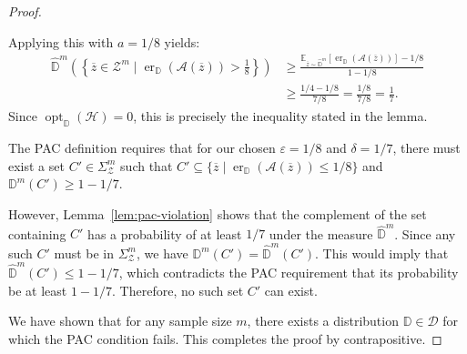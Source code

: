 \begin{proof}
\begin{subproof}
        Applying this with $a=1/8$ yields:
        \begin{align*}
            \widehat{\mathbb{D}}^m\left(\left\{ \overline{z} \in \mathcal{Z}^m \mid \operatorname{er}_{\mathbb{D}}(\mathcal{A}(\overline{z})) > \frac{1}{8} \right\}\right) &\ge \frac{\mathbb{E}_{\overline{z}\sim\widehat{\mathbb{D}}^m}[\operatorname{er}_{\mathbb{D}}(\mathcal{A}(\overline{z}))] - 1/8}{1 - 1/8} \\
            &\ge \frac{1/4 - 1/8}{7/8} = \frac{1/8}{7/8} = \frac{1}{7}.
        \end{align*}
        Since $\operatorname{opt}_{\mathbb{D}}(\mathcal{H}) = 0$, this is precisely the inequality stated in the lemma.
    \end{subproof}

    The PAC definition requires that for our chosen $\varepsilon=1/8$ and $\delta=1/7$, there must exist a set $C' \in \Sigma_{\mathcal{Z}}^m$ such that $C' \subseteq \{ \overline{z} \mid \operatorname{er}_{\mathbb{D}}(\mathcal{A}(\overline{z})) \le 1/8 \}$ and $\mathbb{D}^m(C') \ge 1 - 1/7$.

    However, Lemma~\ref{lem:pac-violation} shows that the complement of the set containing $C'$ has a probability of at least $1/7$ under the measure $\widehat{\mathbb{D}}^m$. Since any such $C'$ must be in $\Sigma_{\mathcal{Z}}^m$, we have $\mathbb{D}^m(C') = \widehat{\mathbb{D}}^m(C')$. This would imply that $\widehat{\mathbb{D}}^m(C') \le 1 - 1/7$, which contradicts the PAC requirement that its probability be at least $1 - 1/7$. Therefore, no such set $C'$ can exist.

    We have shown that for any sample size $m$, there exists a distribution $\mathbb{D} \in \mathcal{D}$ for which the PAC condition fails. This completes the proof by contrapositive.
\end{proof}